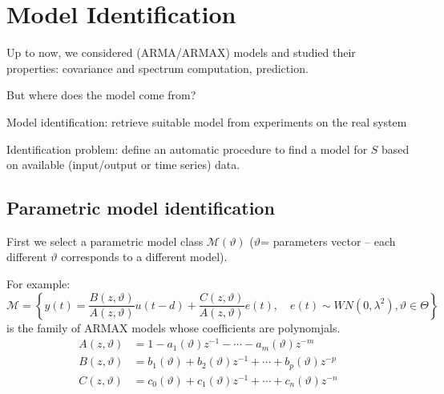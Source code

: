 \section{Model Identification}

Up to now, we considered (ARMA/ARMAX) models and studied their properties: covariance and spectrum computation, prediction.

But where does the model come from?

Model identification: retrieve suitable model from experiments on the real system 


Identification problem: define an automatic procedure to find a model for $S$ based on available (input/output or time series) data.

\begin{figure}[htpb]
	\centering
\end{figure}
\FloatBarrier

\subsection{Parametric model identification}

First we select a parametric model class $\mathcal{M}(\vartheta)$ ($\vartheta$= parameters vector – each different $\vartheta$ corresponds to a different model).

For example:
$$
	\mathcal{M}=\left\{y(t)=\frac{B(z, \vartheta)}{A(z, \vartheta)} u(t-d)+\frac{C(z, \vartheta)}{A(z, \vartheta)} e(t), \quad e(t) \sim WN\left(0, \lambda^{2}\right), \vartheta\in\Theta\right\}
$$
is the family of ARMAX models whose coefficients are polynomjals.
\begin{align*}
	A(z, \vartheta)&=1-a_{1}(\vartheta) z^{-1}-\cdots-a_{m}(\vartheta) z^{-m} \\
	B(z, \vartheta)&=b_{1}(\vartheta)+b_{2}(\vartheta) z^{-1}+\cdots+b_{p}(\vartheta) z^{-p}\\
	C(z, \vartheta)&=c_0(\vartheta)+c_{1}(\vartheta) z^{-1}+\cdots+c_{n}(\vartheta) z^{-n}
\end{align*}

